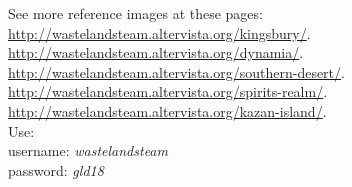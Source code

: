 See more reference images at these pages:\\
\href{http://wastelandsteam.altervista.org/kingsbury/}{http://wastelandsteam.altervista.org/kingsbury/}.\\
\href{http://wastelandsteam.altervista.org/dynamia/}{http://wastelandsteam.altervista.org/dynamia/}.\\
\href{http://wastelandsteam.altervista.org/southern-desert/}{http://wastelandsteam.altervista.org/southern-desert/}.\\
\href{http://wastelandsteam.altervista.org/spirits-realm/}{http://wastelandsteam.altervista.org/spirits-realm/}.\\
\href{http://wastelandsteam.altervista.org/kazan-island/}{http://wastelandsteam.altervista.org/kazan-island/}.\\
Use:\\
username: \textit{wastelandsteam}\\
password: \textit{gld18}
